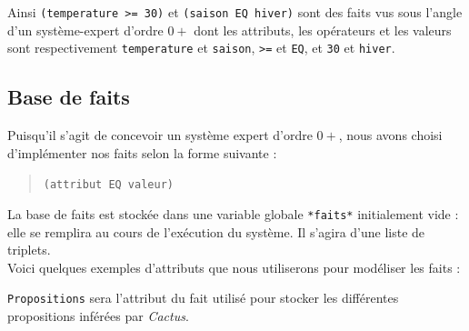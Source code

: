 \documentclass[a4paper,12pt]{article}
\begin{document}
	Ainsi \texttt{(temperature >= 30)} et \texttt{(saison EQ hiver)} sont des faits vus sous l'angle d'un système-expert d'ordre $0+$ dont les attributs, les opérateurs et les valeurs sont respectivement 	\texttt{temperature} et \texttt{saison}, \texttt{>=} et \texttt{EQ}, et \texttt{30} et \texttt{hiver}.

\subsection{Base de faits}

Puisqu'il s'agit de concevoir un système expert d'ordre $0+$, nous avons choisi d'implémenter nos faits selon la forme suivante :

\begin{quotation}
	\texttt{(attribut EQ valeur)}
\end{quotation}

La base de faits est stockée dans une variable globale \texttt{*faits*} initialement vide : elle se remplira au cours de l'exécution du système. Il s'agira d'une liste de triplets.\\

Voici quelques exemples d'attributs que nous utiliserons pour modéliser les faits :

\begin{table}[H]
		\label{exempleAttributs}
		\caption{Exemple d'attributs pour les faits}
\end{table}

\texttt{Propositions} sera l'attribut du fait utilisé pour stocker les différentes propositions inférées par \textit{Cactus}.
\end{document}
